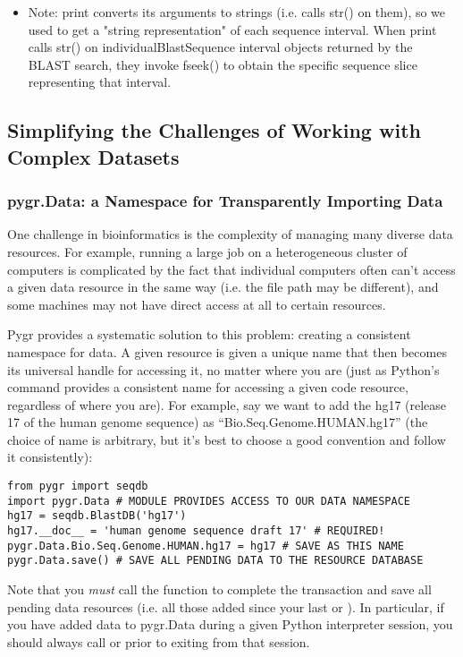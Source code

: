 \documentclass{howto}
\begin{document}
\begin{itemize}
\item
Note: print converts its arguments to strings (i.e. calls str() on them), so we used  to get a "string representation" of each sequence interval.  When print calls str() on individualBlastSequence interval objects returned by the BLAST search, they invoke fseek() to obtain the specific sequence slice representing that interval.
\end{itemize}

\subsection{Simplifying the Challenges of Working with Complex Datasets}
\subsubsection{pygr.Data: a Namespace for Transparently Importing Data}
One challenge in bioinformatics is the complexity of managing many diverse
data resources.  For example, running a large job on a heterogeneous cluster
of computers is complicated by the fact that individual computers often can't
access a given data resource in the same way (i.e. the file path may be different),
and some machines may not have direct access at all to certain resources.

Pygr provides a systematic solution to this problem: creating a consistent
namespace for data.  A given resource is given a unique name that then becomes
its universal handle for accessing it, no matter where you are (just as Python's
 command provides a consistent name for accessing a given code
resource, regardless of where you are).  For example, say we want to add the
hg17 (release 17 of the human genome sequence) as ``Bio.Seq.Genome.HUMAN.hg17''
(the choice of name is arbitrary, but it's best to choose a good convention and follow
it consistently):

\begin{verbatim}
from pygr import seqdb
import pygr.Data # MODULE PROVIDES ACCESS TO OUR DATA NAMESPACE
hg17 = seqdb.BlastDB('hg17')
hg17.__doc__ = 'human genome sequence draft 17' # REQUIRED!
pygr.Data.Bio.Seq.Genome.HUMAN.hg17 = hg17 # SAVE AS THIS NAME
pygr.Data.save() # SAVE ALL PENDING DATA TO THE RESOURCE DATABASE
\end{verbatim}
Note that you {\em must} call the function  to 
complete the transaction and save all pending data resources
(i.e. all those added since your last  or
).  In particular, if you have added
data to pygr.Data during a given Python interpreter session, you
should always call  or
 prior to exiting from that session.
\end{document}
